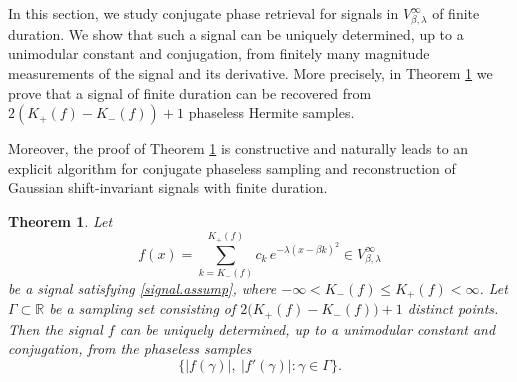 \documentclass[11pt,oneside,reqno]{amsart}
\newtheorem{thm}{Theorem}[section]
\numberwithin{equation}{section}
\begin{document}
\medskip
In this section, we study conjugate phase retrieval for signals in
$V^\infty_{\beta,\lambda}$ of finite duration.
We show that such a signal can be uniquely determined, up to a unimodular constant
and conjugation, from finitely many magnitude measurements of the signal and its
derivative.
More precisely, in Theorem \ref{finite.cpr.thm} we prove that a signal of finite
duration can be recovered from $2(K_+(f)-K_-(f))+1$ phaseless Hermite samples.

\medskip

Moreover, the proof of Theorem \ref{finite.cpr.thm} is constructive and naturally
leads to an explicit algorithm for conjugate phaseless sampling and reconstruction
of Gaussian shift-invariant signals with finite duration.

\begin{thm}\label{finite.cpr.thm}
{\rm Let
\[
f(x)=\sum_{k=K_-(f)}^{K_+(f)} c_k\, e^{-\lambda(x-\beta k)^2}
\in V^\infty_{\beta,\lambda}
\]
be a signal satisfying \eqref{signal.assump}, where
$-\infty< K_-(f)\le K_+(f)<\infty$.
Let $\Gamma\subset\mathbb R$ be a sampling set consisting of
$ 2\bigl(K_+(f)-K_-(f)\bigr)+1$  
distinct points. Then the signal $f$ can be uniquely determined, up to a unimodular
constant and conjugation, from the phaseless samples
\[
\bigl\{|f(\gamma)|,\ |f'(\gamma)| : \gamma\in\Gamma\bigr\}.
\]}
\end{thm}

\medskip

\end{document}
